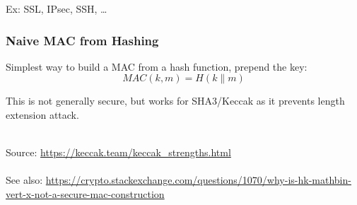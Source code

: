 \documentclass[aspectratio=169, lualatex, 10pt,dvipsnames,svgnames]{beamer} %
\def\engris#1{\textcolor{gris}{#1}}
\def\envert#1{\textcolor{vert}{#1}}
\begin{document}
\begin{frame}
\begin{center}
    \end{center}

    
  \envert{Ex: SSL, IPsec, SSH, \dots}

\end{frame}

\begin{frame}

  \frametitle{Naive MAC from Hashing}

  Simplest way to build a MAC from a hash function, prepend the key:
  \[
  MAC(k,m) = H(k \| m)
  \]

  This is not generally secure, but works for SHA3/Keccak as it prevents length extension attack. \\ \

\engris{Source: \url{https://keccak.team/keccak_strengths.html}} \\ \ \\ 

\engris{See also: \url{https://crypto.stackexchange.com/questions/1070/why-is-hk-mathbin-vert-x-not-a-secure-mac-construction}}
\end{frame}



\begin{frame}
  \maketitle
\end{frame}
\end{document}
